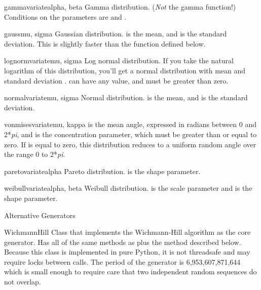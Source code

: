 \begin{funcdesc}{gammavariate}{alpha, beta}
  Gamma distribution.  (\emph{Not} the gamma function!)  Conditions on
  the parameters are  and .
\end{funcdesc}

\begin{funcdesc}{gauss}{mu, sigma}
  Gaussian distribution.   is the mean, and  is the
  standard deviation.  This is slightly faster than the
   function defined below.
\end{funcdesc}

\begin{funcdesc}{lognormvariate}{mu, sigma}
  Log normal distribution.  If you take the natural logarithm of this
  distribution, you'll get a normal distribution with mean 
  and standard deviation .   can have any value,
  and  must be greater than zero.
\end{funcdesc}

\begin{funcdesc}{normalvariate}{mu, sigma}
  Normal distribution.   is the mean, and  is the
  standard deviation.
\end{funcdesc}

\begin{funcdesc}{vonmisesvariate}{mu, kappa}
   is the mean angle, expressed in radians between 0 and
  2*\emph{pi}, and  is the concentration parameter, which
  must be greater than or equal to zero.  If  is equal to
  zero, this distribution reduces to a uniform random angle over the
  range 0 to 2*\emph{pi}.
\end{funcdesc}

\begin{funcdesc}{paretovariate}{alpha}
  Pareto distribution.   is the shape parameter.
\end{funcdesc}

\begin{funcdesc}{weibullvariate}{alpha, beta}
  Weibull distribution.   is the scale parameter and
   is the shape parameter.
\end{funcdesc}

Alternative Generators

\begin{classdesc}{WichmannHill}{}
Class that implements the Wichmann-Hill algorithm as the core generator.
Has all of the same methods as  plus the 
method described below.  Because this class is implemented in pure
Python, it is not threadsafe and may require locks between calls.  The
period of the generator is 6,953,607,871,644 which is small enough to
require care that two independent random sequences do not overlap.
\end{classdesc}

